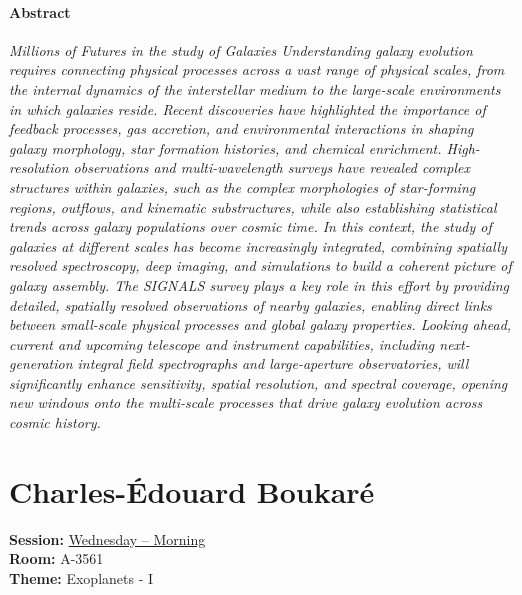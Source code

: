 \paragraph{Abstract}
{\itshape
Millions of Futures in the study of Galaxies
Understanding galaxy evolution requires connecting physical processes across a vast range of physical scales, from the internal dynamics of the interstellar medium to the large-scale environments in which galaxies reside. Recent discoveries have highlighted the importance of feedback processes, gas accretion, and environmental interactions in shaping galaxy morphology, star formation histories, and chemical enrichment. High-resolution observations and multi-wavelength surveys have revealed complex structures within galaxies, such as the complex morphologies of star-forming regions, outflows, and kinematic substructures, while also establishing statistical trends across galaxy populations over cosmic time. In this context, the study of galaxies at different scales has become increasingly integrated, combining spatially resolved spectroscopy, deep imaging, and simulations to build a coherent picture of galaxy assembly. The SIGNALS survey plays a key role in this effort by providing detailed, spatially resolved observations of nearby galaxies, enabling direct links between small-scale physical processes and global galaxy properties. Looking ahead, current and upcoming telescope and instrument capabilities, including next-generation integral field spectrographs and large-aperture observatories, will significantly enhance sensitivity, spatial resolution, and spectral coverage, opening new windows onto the multi-scale processes that drive galaxy evolution across cosmic history.
}

\hypertarget{invited-charles-edouard-boukare}{}
\label{invited-page-charles-edouard-boukare}
\section{Charles-Édouard Boukaré}
\textbf{Session:} \hyperlink{schedule-wednesday-morning-a-3561}{Wednesday -- Morning}\\
\textbf{Room:} A-3561\\
\textbf{Theme:} Exoplanets - I\\

